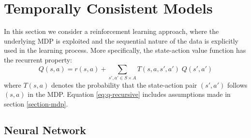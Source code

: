 \documentclass{sfuthesis}
\begin{document}
	\section{Temporally Consistent Models}
	
	In this section we consider a reinforcement learning approach, where the underlying MDP is exploited and the sequential nature of the data is explicitly used in the learning process. More specifically, the state-action value function has the recurrent property:
	\begin{equation}
		Q(s,a) = r(s,a) +\sum_{s',a' \in S \times A} T(s,a,s',a') \; Q(s', a')
		\label{eq:q-recursive}
	\end{equation}
	where $T(s,a)$ denotes the probability that the state-action pair $(s',a')$ follows $(s,a)$ in the MDP. Equation \eqref{eq:q-recursive} includes assumptions made in section \ref{section-mdp}.
	
	\subsection{Neural Network}
	
\end{document}

